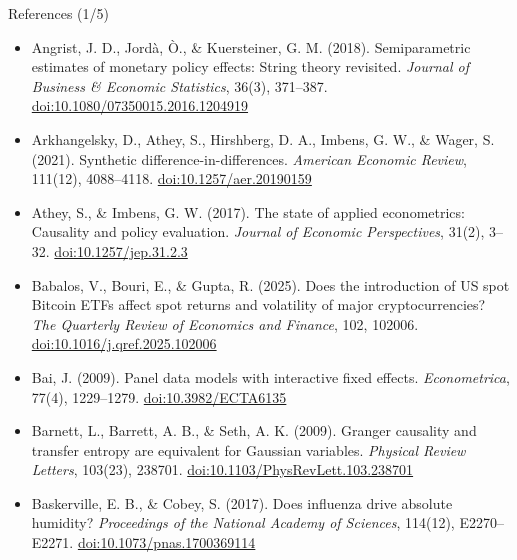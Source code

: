 \begin{frame}{References (1/5)}
\begin{itemize}
    \item Angrist, J. D., Jordà, Ò., \& Kuersteiner, G. M. (2018). Semiparametric estimates of monetary policy effects: String theory revisited. \textit{Journal of Business \& Economic Statistics}, 36(3), 371--387. \href{https://doi.org/10.1080/07350015.2016.1204919}{doi:10.1080/07350015.2016.1204919}
    \item Arkhangelsky, D., Athey, S., Hirshberg, D. A., Imbens, G. W., \& Wager, S. (2021). Synthetic difference-in-differences. \textit{American Economic Review}, 111(12), 4088--4118. \href{https://doi.org/10.1257/aer.20190159}{doi:10.1257/aer.20190159}
    \item Athey, S., \& Imbens, G. W. (2017). The state of applied econometrics: Causality and policy evaluation. \textit{Journal of Economic Perspectives}, 31(2), 3--32. \href{https://doi.org/10.1257/jep.31.2.3}{doi:10.1257/jep.31.2.3}
    \item Babalos, V., Bouri, E., \& Gupta, R. (2025). Does the introduction of US spot Bitcoin ETFs affect spot returns and volatility of major cryptocurrencies? \textit{The Quarterly Review of Economics and Finance}, 102, 102006. \href{https://doi.org/10.1016/j.qref.2025.102006}{doi:10.1016/j.qref.2025.102006}
    \item Bai, J. (2009). Panel data models with interactive fixed effects. \textit{Econometrica}, 77(4), 1229--1279. \href{https://doi.org/10.3982/ECTA6135}{doi:10.3982/ECTA6135}
    \item Barnett, L., Barrett, A. B., \& Seth, A. K. (2009). Granger causality and transfer entropy are equivalent for Gaussian variables. \textit{Physical Review Letters}, 103(23), 238701. \href{https://doi.org/10.1103/PhysRevLett.103.238701}{doi:10.1103/PhysRevLett.103.238701}
    \item Baskerville, E. B., \& Cobey, S. (2017). Does influenza drive absolute humidity? \textit{Proceedings of the National Academy of Sciences}, 114(12), E2270--E2271. \href{https://doi.org/10.1073/pnas.1700369114}{doi:10.1073/pnas.1700369114}
\end{itemize}
\end{frame}

